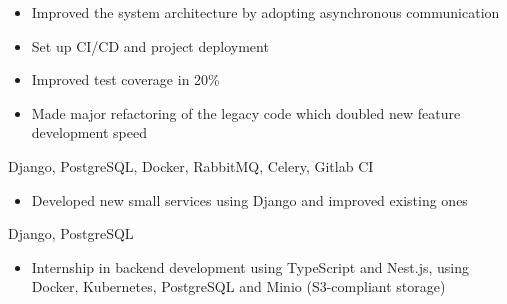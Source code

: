 \documentclass[10pt,a4paper,ragged2e,withhyper]{altacv}
\begin{document}
\begin{paracol}{2}


\begin{itemize}
\item Improved the system architecture by adopting asynchronous communication
\item Set up CI/CD and project deployment
\item Improved test coverage in 20\%
\item Made major refactoring of the legacy code which doubled new feature development speed
\end{itemize}
Django, PostgreSQL, Docker, RabbitMQ, Celery, Gitlab CI

\divider


\begin{itemize}
    \item Developed new small services using Django and improved existing ones
\end{itemize}
Django, PostgreSQL

\divider


\begin{itemize}
    \item Internship in backend development using TypeScript and Nest.js, using Docker, Kubernetes, PostgreSQL and Minio (S3-compliant storage)
\end{itemize}

\switchcolumn







\end{paracol}
\end{document}
